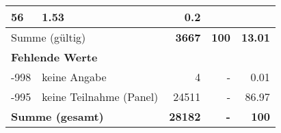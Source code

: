 \begin{longtable}{lXrrr}
       \num{56} &
       \num[round-mode=places,round-precision=2]{1.53} &
         \num[round-mode=places,round-precision=2]{0.2} \\
     \midrule
     \multicolumn{2}{l}{Summe (gültig)} &
       \textbf{\num{3667}} &
     \textbf{100} &
       \textbf{\num[round-mode=places,round-precision=2]{13.01}} \\
     \multicolumn{5}{l}{\textbf{Fehlende Werte}}\\
       -998 &
       keine Angabe &
         \num{4} &
        - &
         \num[round-mode=places,round-precision=2]{0.01} \\
       -995 &
       keine Teilnahme (Panel) &
         \num{24511} &
        - &
         \num[round-mode=places,round-precision=2]{86.97} \\
     \midrule
     \multicolumn{2}{l}{\textbf{Summe (gesamt)}} &
          \textbf{\num{28182}} &
        \textbf{-} &
        \textbf{100} \\
     \bottomrule
     \end{longtable}
     
